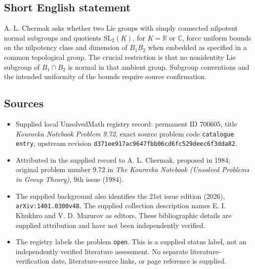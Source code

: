 \documentclass[11pt]{article}
\newcommand{\R}{\mathbb{R}}
\newcommand{\C}{\mathbb{C}}
\begin{document}
\subsection{Short English statement}
A. L. Chermak asks whether two Lie groups with simply connected nilpotent normal subgroups and quotients \(\mathrm{SL}_2(K)\), for \(K=\R\) or \(\C\), force uniform bounds on the nilpotency class and dimension of \(B_1B_2\) when embedded as specified in a common topological group. The crucial restriction is that no nonidentity Lie subgroup of \(B_1\cap B_2\) is normal in that ambient group. Subgroup conventions and the intended uniformity of the bounds require source confirmation.
\subsection{Sources}
\begin{itemize}
\item Supplied local UnsolvedMath registry record: permanent ID \(700605\), title \emph{Kourovka Notebook Problem 9.72}, exact source problem code \texttt{catalogue entry}, upstream revision \texttt{d371ee917ac9647fbb06cd6fc529deec6f3dda82}.
\item Attributed in the supplied record to A. L. Chermak, proposed in 1984; original problem number 9.72 in \emph{The Kourovka Notebook (Unsolved Problems in Group Theory)}, 9th issue (1984).
\item The supplied background also identifies the 21st issue edition (2026), \texttt{arXiv:1401.0300v48}. The supplied collection description names E. I. Khukhro and V. D. Mazurov as editors. These bibliographic details are supplied attribution and have not been independently verified.
\item The registry labels the problem \texttt{open}. This is a supplied status label, not an independently verified literature assessment. No separate literature-verification date, literature-source links, or page reference is supplied.
\end{itemize}
\end{document}
